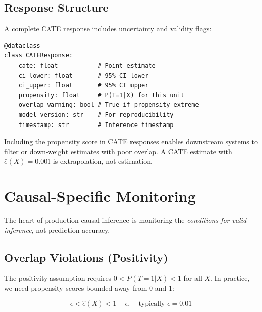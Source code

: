 \subsection{Response Structure}

A complete CATE response includes uncertainty and validity flags:

\begin{verbatim}
@dataclass
class CATEResponse:
    cate: float           # Point estimate
    ci_lower: float       # 95% CI lower
    ci_upper: float       # 95% CI upper
    propensity: float     # P(T=1|X) for this unit
    overlap_warning: bool # True if propensity extreme
    model_version: str    # For reproducibility
    timestamp: str        # Inference timestamp
\end{verbatim}

\begin{keyinsight}
Including the propensity score in CATE responses enables downstream systems to filter or down-weight estimates with poor overlap. A CATE estimate with $\hat{e}(X) = 0.001$ is extrapolation, not estimation.
\end{keyinsight}


\section{Causal-Specific Monitoring}\label{sec:causal_monitoring}

The heart of production causal inference is monitoring the \textit{conditions for valid inference}, not prediction accuracy.

\subsection{Overlap Violations (Positivity)}

The positivity assumption requires $0 < P(T=1|X) < 1$ for all $X$. In practice, we need propensity scores bounded away from 0 and 1:

\begin{equation}
\epsilon < \hat{e}(X) < 1 - \epsilon, \quad \text{typically } \epsilon = 0.01
\end{equation}

